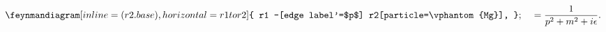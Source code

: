 \documentclass[preview]{standalone}
\begin{document}
\abovedisplayskip=0pt
\begin{alignat*}{2}
    \feynmandiagram [inline=(r2.base), horizontal=r1 to r2] {
        r1 --[edge label'=$p$] r2[particle=\vphantom{Mg}],
    }; \ &&= \frac{1}{p^2 + m^2 + i\epsilon}.
\end{alignat*}
\end{document}
